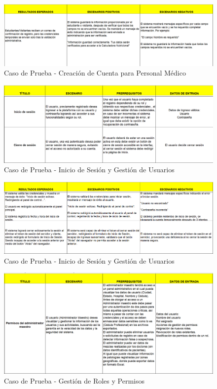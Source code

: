 \documentclass[12pt,letterpaper,spanish, xcolor=table]{report}
\numberwithin{figure}{subsection}
\begin{document}
	\begin{figure}[H]
		\centering
		\includegraphics[width=1.0\textwidth]
		{Imagenes/CalculadoraNutricional/CPCuentaEstudiante2.png}
		\caption{Caso de Prueba - Creación de Cuenta para Personal Médico
		}\label{a2}
	\end{figure}
	
	\begin{figure}[H]
		\centering
		\includegraphics[width=1.0\textwidth]
		{Imagenes/CalculadoraNutricional/CPSesionGestion.png}
		\caption{Caso de Prueba - Inicio de Sesión y Gestión de Usuarios
		}\label{a2}
	\end{figure}
	
	\begin{figure}[H]
		\centering
		\includegraphics[width=1.0\textwidth]
		{Imagenes/CalculadoraNutricional/CPSesionGestion2.png}
		\caption{Caso de Prueba - Inicio de Sesión y Gestión de Usuarios
		}\label{a2}
	\end{figure}
	
	
	\begin{figure}[H]
		\centering
		\includegraphics[width=1.0\textwidth]
		{Imagenes/CalculadoraNutricional/CPRolesPermisos.png}
		\caption{Caso de Prueba - Gestión de Roles y Permisos
		}\label{a2}
	\end{figure}
	
\end{document}
